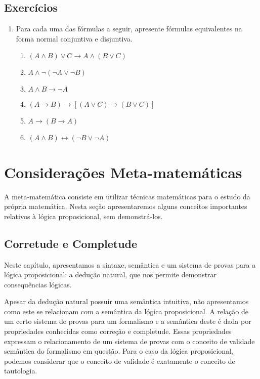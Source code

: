 \subsection{Exercícios}

\begin{enumerate}
        \item Para cada uma das fórmulas a seguir, apresente fórmulas
          equivalentes na forma normal conjuntiva e disjuntiva.
	\begin{enumerate}
		\item $(A\land B)\lor C\rightarrow A\land(B\lor C)$
		\item $A\land\neg (\neg A\lor \neg B)$
		\item $A\land B\rightarrow\neg A$
		\item $(A\rightarrow B)\rightarrow[(A\lor C)\rightarrow (B\lor C)]$
		\item $A\rightarrow(B\rightarrow A)$
		\item $(A\land B)\leftrightarrow(\neg B\lor \neg A)$
	\end{enumerate}
\end{enumerate}


\section{Considerações Meta-matemáticas}\label{soundcompleteprop}



A meta-matemática consiste em utilizar técnicas matemáticas para o
estudo da própria matemática. Nesta seção apresentaremos alguns
conceitos importantes relativos à lógica proposicional, sem demonstrá-los.

\subsection{Corretude e Completude}

Neste capítulo, apresentamos a sintaxe,
semântica e um sistema de provas para a lógica proposicional: a dedução
natural, que nos permite demonstrar consequências lógicas.

Apesar da dedução natural possuir uma semântica intuitiva, não apresentamos como este
se relacionam com a semântica da lógica proposicional. A relação de um certo sistema de
provas para um formalismo e a semântica deste é dada por propriedades
conhecidas como correção e completude. Essas propriedades expressam o
relacionamento de um sistema de provas com o conceito de validade
semântica do formalismo em questão. Para o caso da lógica
proposicional, podemos considerar que o conceito de validade é
exatamente o conceito de tautologia.

